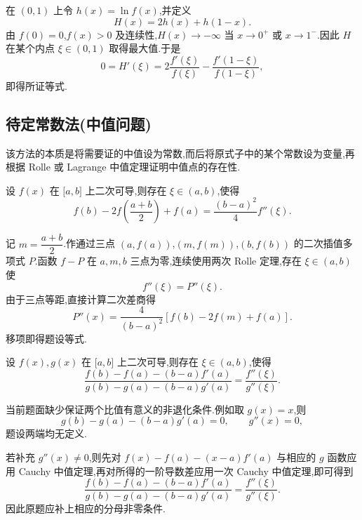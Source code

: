 \begin{solution}
    在 $(0,1)$ 上令 $h(x)=\ln f(x)$,并定义
    \[
        H(x)=2h(x)+h(1-x).
    \]
    由 $f(0)=0$,$f(x)>0$ 及连续性,$H(x)\to-\infty$ 当 $x\to0^+$ 或 $x\to1^-$.因此 $H$ 在某个内点 $\xi\in(0,1)$ 取得最大值.于是
    \[
        0=H'(\xi)
        =2\dfrac{f'(\xi)}{f(\xi)}
        -\dfrac{f'(1-\xi)}{f(1-\xi)},
    \]
    即得所证等式.
\end{solution}



\subsection{待定常数法(中值问题)}

该方法的本质是将需要证的中值设为常数,而后将原式子中的某个常数设为变量,再根据 Rolle 或 Lagrange 中值定理证明中值点的存在性.

\begin{example}
    设 $f(x)$ 在 $\lbrack a,b\rbrack$ 上二次可导,则存在 $\xi\in(a,b)$,使得
    \[
        f(b)-2f\left(\dfrac{a+b}{2}\right)+f(a)
        =\dfrac{(b-a)^2}{4}f''(\xi).
    \]
\end{example}
\exampleblank

\begin{solution}
    记 $m=\dfrac{a+b}{2}$.作通过三点 $(a,f(a))$,$(m,f(m))$,$(b,f(b))$ 的二次插值多项式 $P$.函数 $f-P$ 在 $a,m,b$ 三点为零,连续使用两次 Rolle 定理,存在 $\xi\in(a,b)$ 使
    \[
        f''(\xi)=P''(\xi).
    \]
    由于三点等距,直接计算二次差商得
    \[
        P''(x)=\dfrac{4}{(b-a)^2}
        \left[f(b)-2f(m)+f(a)\right].
    \]
    移项即得题设等式.
\end{solution}

\begin{example}
    设 $f(x),g(x)$ 在 $\lbrack a,b\rbrack$ 上二次可导,则存在 $\xi\in(a,b)$,使得
    \[
        \dfrac{f(b)-f(a)-(b-a)f'(a)}{g(b)-g(a)-(b-a)g'(a)}
        =\dfrac{f''(\xi)}{g''(\xi)}.
    \]
\end{example}
\exampleblank

\begin{solution}
    当前题面缺少保证两个比值有意义的非退化条件.例如取 $g(x)=x$,则
    \[
        g(b)-g(a)-(b-a)g'(a)=0,
        \qquad
        g''(x)=0,
    \]
    题设两端均无定义.

    若补充 $g''(x)\neq0$,则先对 $f(x)-f(a)-(x-a)f'(a)$ 与相应的 $g$ 函数应用 Cauchy 中值定理,再对所得的一阶导数差应用一次 Cauchy 中值定理,即可得到
    \[
        \dfrac{f(b)-f(a)-(b-a)f'(a)}
        {g(b)-g(a)-(b-a)g'(a)}
        =\dfrac{f''(\xi)}{g''(\xi)}.
    \]
    因此原题应补上相应的分母非零条件.
\end{solution}

